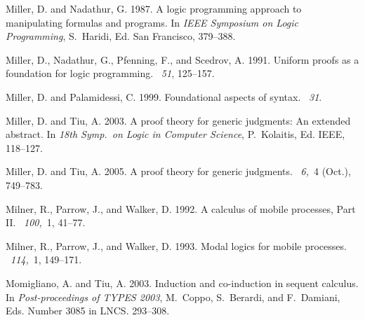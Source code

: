 \documentclass{acmtrans2m}
\begin{document}
\begin{thebibliography}{}
{\sc Miller, D.} {\sc and} {\sc Nadathur, G.} 1987.
\newblock A logic programming approach to manipulating formulas and programs.
\newblock In {\em IEEE Symposium on Logic Programming}, {S.~Haridi}, Ed. San
  Francisco, 379--388.

{\sc Miller, D.}, {\sc Nadathur, G.}, {\sc Pfenning, F.}, {\sc and} {\sc
  Scedrov, A.} 1991.
\newblock Uniform proofs as a foundation for logic programming.
~{\em 51}, 125--157.

{\sc Miller, D.} {\sc and} {\sc Palamidessi, C.} 1999.
\newblock Foundational aspects of syntax.
~{\em 31}.

{\sc Miller, D.} {\sc and} {\sc Tiu, A.} 2003.
\newblock A proof theory for generic judgments: An extended abstract.
\newblock In {\em 18th Symp.\ on Logic in Computer Science}, {P.~Kolaitis}, Ed.
  IEEE, 118--127.

{\sc Miller, D.} {\sc and} {\sc Tiu, A.} 2005.
\newblock A proof theory for generic judgments.
~{\em 6,\/}~4 (Oct.),
  749--783.

{\sc Milner, R.}, {\sc Parrow, J.}, {\sc and} {\sc Walker, D.} 1992.
\newblock A calculus of mobile processes, {Part II}.
~{\em 100,\/}~1, 41--77.

{\sc Milner, R.}, {\sc Parrow, J.}, {\sc and} {\sc Walker, D.} 1993.
\newblock Modal logics for mobile processes.
~{\em 114,\/}~1, 149--171.

{\sc Momigliano, A.} {\sc and} {\sc Tiu, A.} 2003.
\newblock Induction and co-induction in sequent calculus.
\newblock In {\em Post-proceedings of TYPES 2003}, {M.~Coppo}, {S.~Berardi},
  {and} {F.~Damiani}, Eds. Number 3085 in LNCS. 293--308.


\end{thebibliography}
\end{document}
